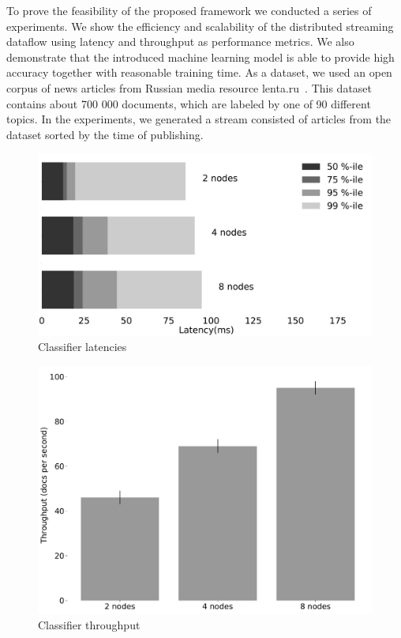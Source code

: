 \label {fs-experiments}

To prove the feasibility of the proposed framework we conducted a series of experiments. We show the efficiency and scalability of the distributed streaming dataflow using latency and throughput as performance metrics. We also demonstrate that the introduced machine learning model is able to provide high accuracy together with reasonable training time. As a dataset, we used an open corpus of news articles from Russian media resource lenta.ru~\cite{lentaru}. This dataset contains about 700 000 documents, which are labeled by one of 90 different topics. In the experiments, we generated a stream consisted of articles from the dataset sorted by the time of publishing.

\begin{figure}[htbp]
  \centering
  \includegraphics[scale=0.1]{pics/classifier_latencies}
  \caption{Classifier latencies}
  \label {latencies}
\end{figure}

\begin{figure}[htbp]
  \centering
  \includegraphics[scale=0.2]{pics/classifier_throughput}
  \caption{Classifier throughput}
  \label {throughput}
\end{figure}

